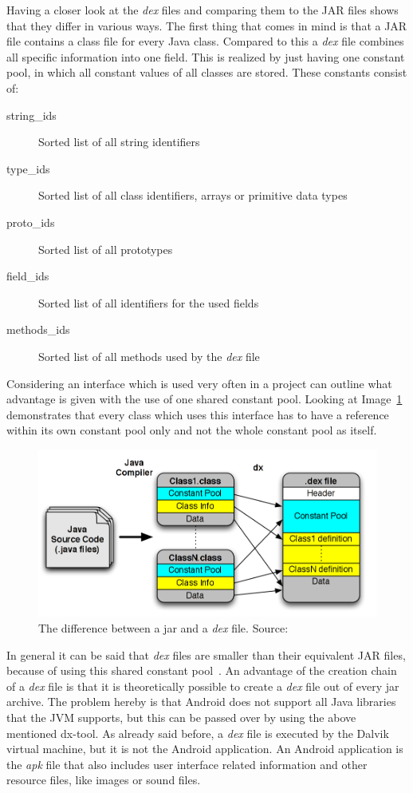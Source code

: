 Having a closer look at the \textit{dex} files and comparing them to the JAR files shows that they differ in various ways.
The first thing that comes in mind is that a JAR file contains a class file for every Java class.
Compared to this a \textit{dex} file combines all specific information into one field.
This is realized by just having one constant pool, in which all constant values of all classes are stored.
These constants consist of:
\begin{description}
  \item[string\_ids] Sorted list of all string identifiers
  \item[type\_ids] Sorted list of all class identifiers, arrays or primitive data types
  \item[proto\_ids] Sorted list of all prototypes
  \item[field\_ids] Sorted list of all identifiers for the used fields
  \item[methods\_ids] Sorted list of all methods used by the \textit{dex} file
\end{description}
Considering an interface which is used very often in a project can outline what advantage is given with the use of one shared constant pool.
Looking at Image~\ref{fig:jar-dex} demonstrates that every class which uses this interface has to have a reference within its own constant pool only and not the whole constant pool as itself.
\begin{figure}[h]
\begin{center}
\includegraphics[scale=0.41]{images/jar-dex.png} 
\caption{The difference between a jar and a \textit{dex} file. Source:\cite{enck2011study}}
\label{fig:jar-dex}
\end{center}
\end{figure}

In general it can be said that \textit{dex} files are smaller than their equivalent JAR files, because of using this shared constant pool~\cite{bornstein2008dalvik}.
An advantage of the creation chain of a \textit{dex} file is that it is theoretically possible to create a \textit{dex} file out of every jar archive.
The problem hereby is that Android does not support all Java libraries that the JVM supports, but this can be passed over by using the above mentioned dx-tool. 
As already said before, a \textit{dex} file is executed by the Dalvik virtual machine, but it is not the Android application.
An Android application is the \textit{apk} file that also includes user interface related information and other resource files, like images or sound files.


